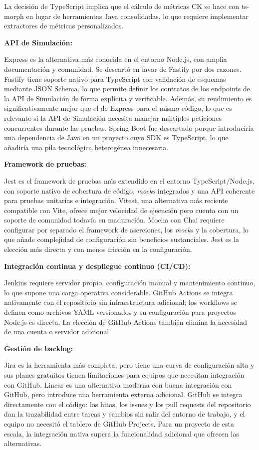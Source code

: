 La decisión de TypeScript implica que el cálculo de métricas CK se hace con ts-morph en lugar de herramientas Java consolidadas, lo que requiere implementar extractores de métricas personalizados.

\textbf{API de Simulación:}

Express es la alternativa más conocida en el entorno Node.js, con amplia documentación y comunidad. Se descartó en favor de Fastify por dos razones. Fastify tiene soporte nativo para TypeScript con validación de esquemas mediante JSON Schema, lo que permite definir los contratos de los endpoints de la API de Simulación de forma explícita y verificable. Además, su rendimiento es significativamente mejor que el de Express para el mismo código, lo que es relevante si la API de Simulación necesita manejar múltiples peticiones concurrentes durante las pruebas. Spring Boot fue descartado porque introduciría una dependencia de Java en un proyecto cuyo SDK es TypeScript, lo que añadiría una pila tecnológica heterogénea innecesaria.

\textbf{Framework de pruebas:}

Jest es el framework de pruebas más extendido en el entorno TypeScript/Node.js, con soporte nativo de cobertura de código, \textit{mocks} integrados y una API coherente para pruebas unitarias e integración. Vitest, una alternativa más reciente compatible con Vite, ofrece mejor velocidad de ejecución pero cuenta con un soporte de comunidad todavía en maduración. Mocha con Chai requiere configurar por separado el framework de aserciones, los \textit{mocks} y la cobertura, lo que añade complejidad de configuración sin beneficios sustanciales. Jest es la elección más directa y con menos fricción en la configuración.

\textbf{Integración continua y despliegue continuo (CI/CD):}

Jenkins requiere servidor propio, configuración manual y mantenimiento continuo, lo que supone una carga operativa considerable. GitHub Actions se integra nativamente con el repositorio sin infraestructura adicional; los workflows se definen como archivos YAML versionados y su configuración para proyectos Node.js es directa. La elección de GitHub Actions también elimina la necesidad de una cuenta o servidor adicional.

\textbf{Gestión de backlog:}

Jira es la herramienta más completa, pero tiene una curva de configuración alta y sus planes gratuitos tienen limitaciones para equipos que necesitan integración con GitHub. Linear es una alternativa moderna con buena integración con GitHub, pero introduce una herramienta externa adicional. GitHub se integra directamente con el código: los hitos, los issues y los pull requests del repositorio dan la trazabilidad entre tareas y cambios sin salir del entorno de trabajo, y el equipo no necesitó el tablero de GitHub Projects. Para un proyecto de esta escala, la integración nativa supera la funcionalidad adicional que ofrecen las alternativas.
